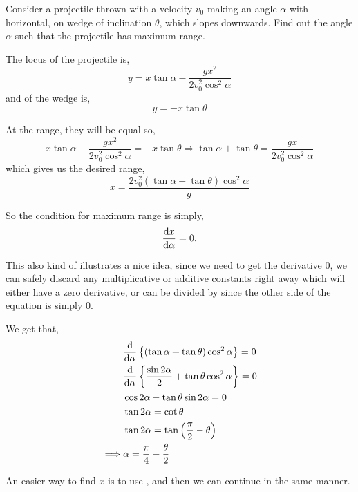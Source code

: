     \begin{example}
        \label{ex: max-wedge-projectile}
        Consider a projectile thrown with a velocity $v_0$ making an angle $\alpha$ with horizontal, on wedge of inclination 
        $\theta$, which slopes downwards. Find out the angle $\alpha$ such that the projectile has maximum range.

        \begin{soln}
            The locus of the projectile is,
            \[
            y = x \tan \alpha - \frac{g x^2}{2 v_0^2 \cos^2 \alpha}
            \]
            and of the wedge is,
            \[
            y = -x \tan \theta
            \]
                    
            At the range, they will be equal so,      
            \[
            x \tan \alpha - \frac{g x^2}{2 v_0^2 \cos^2 \alpha} = 
            -x \tan \theta 
            \Longrightarrow \tan \alpha + \tan \theta = 
            \frac{g x}{2 v_0^2 \cos^2 \alpha}
            \]
            which gives us the desired range,      
            \[
            x = \frac{2 v_0^2 (\tan \alpha + \tan \theta) 
            \cos^2 \alpha}{g}
            \]
                    
            So the condition for maximum range is simply,
            \[
            \dv{x}{\alpha} = 0.
            \]

            This also kind of illustrates a nice idea, since we need to get 
            the derivative 0, we can safely discard any multiplicative or 
            additive constants right away which will either have a zero 
            derivative, or can be divided by since the other side of 
            the equation is simply 0.
                    
            We get that,
            \begin{align*}
                &\dv{}{\alpha} \left\{ 
                    (\tan \alpha + \tan \theta) \cos^2 \alpha 
                \right\} = 0 \\
                &\dv{}{\alpha} \left\{ 
                    \frac{\sin 2\alpha}{2} + \tan \theta 
                    \cos^2 \alpha 
                \right\} = 0 \\
                &\cos 2\alpha - \tan \theta \sin 2\alpha = 0 \\
                &\tan 2\alpha = \cot \theta \\
                &\tan 2\alpha = \tan\left( \frac{\pi}{2} - \theta \right) \\
                \implies &\alpha = \frac{\pi}{4} - \frac{\theta}{2}
                \end{align*}
             \end{soln}
             
             An easier way to find $x$ is to use , and then we can continue in the same
             manner.
    \end{example}

